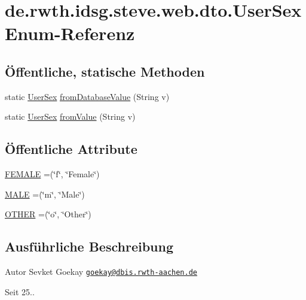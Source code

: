 \hypertarget{enumde_1_1rwth_1_1idsg_1_1steve_1_1web_1_1dto_1_1_user_sex}{\section{de.\-rwth.\-idsg.\-steve.\-web.\-dto.\-User\-Sex Enum-\/\-Referenz}
\label{enumde_1_1rwth_1_1idsg_1_1steve_1_1web_1_1dto_1_1_user_sex}
}
\subsection*{Öffentliche, statische Methoden}
\begin{DoxyCompactItemize}
\item 
static \hyperlink{enumde_1_1rwth_1_1idsg_1_1steve_1_1web_1_1dto_1_1_user_sex}{User\-Sex} \hyperlink{enumde_1_1rwth_1_1idsg_1_1steve_1_1web_1_1dto_1_1_user_sex_a1b689ca1d0045c0b3eed67418e556098}{from\-Database\-Value} (String v)
\item 
static \hyperlink{enumde_1_1rwth_1_1idsg_1_1steve_1_1web_1_1dto_1_1_user_sex}{User\-Sex} \hyperlink{enumde_1_1rwth_1_1idsg_1_1steve_1_1web_1_1dto_1_1_user_sex_ab56a204fa14e3f06adfbcca66f94871b}{from\-Value} (String v)
\end{DoxyCompactItemize}
\subsection*{Öffentliche Attribute}
\begin{DoxyCompactItemize}
\item 
\hyperlink{enumde_1_1rwth_1_1idsg_1_1steve_1_1web_1_1dto_1_1_user_sex_aa82cabc94ee438298f4bc78868ed628a}{F\-E\-M\-A\-L\-E} =(\char`\"{}f\char`\"{}, \char`\"{}Female\char`\"{})
\item 
\hyperlink{enumde_1_1rwth_1_1idsg_1_1steve_1_1web_1_1dto_1_1_user_sex_a70e31e0ed5db4940c1060e714c168c3c}{M\-A\-L\-E} =(\char`\"{}m\char`\"{}, \char`\"{}Male\char`\"{})
\item 
\hyperlink{enumde_1_1rwth_1_1idsg_1_1steve_1_1web_1_1dto_1_1_user_sex_a0a5e04c68f2d3a46583ada44e1920da9}{O\-T\-H\-E\-R} =(\char`\"{}o\char`\"{}, \char`\"{}Other\char`\"{})
\end{DoxyCompactItemize}


\subsection{Ausführliche Beschreibung}
\begin{DoxyAuthor}{Autor}
Sevket Goekay \href{mailto:goekay@dbis.rwth-aachen.de}{\tt goekay@dbis.\-rwth-\/aachen.\-de} 
\end{DoxyAuthor}
\begin{DoxySince}{Seit}
25.. 
\end{DoxySince}


